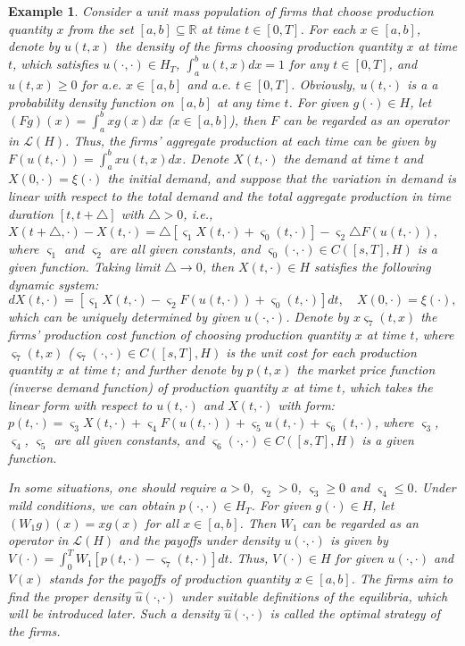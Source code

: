 \documentclass[10pt]{article}
\newtheorem{example}{Example}[section]
\begin{document}
\begin{example}\label{75}
 Consider  a unit mass population of firms that choose production quantity  $x$ from the set $[a,b]\subseteq\mathbb{R}$ at time $t\in[0,T]$. For each $x\in [a,b]$,  denote by $u(t,x)$  the  density of the firms choosing production quantity $x$ at   time $t$, which satisfies $u(\cdot,\cdot)\in H_T$, $\int_a^bu(t,x)dx=1$ for any $t\in[0,T]$, and $u(t,x)\geq0$ for a.e.  $x\in [a,b]$ and  a.e. $t\in[0,T]$. Obviously, $u(t,\cdot)$ is a a probability density function on $[a,b]$ at any time $t$.  For given $g(\cdot)\in H$, let $(Fg)(x)=\int_a^bxg(x)dx$ ($x\in[a,b]$), then $F$ can be regarded as an operator in $\mathcal{L}(H)$. Thus, the firms' aggregate production at each time can be given by $F(u(t,\cdot))=\int_a^bxu(t,x)dx$.  Denote $X(t,\cdot)$  the demand at time $t$  and $X(0,\cdot)=\xi(\cdot)$ the initial demand, and suppose that the variation in demand is linear with respect to the total  demand  and the total aggregate production in time duration $[t,t+\triangle]$ with $\triangle>0$, i.e.,
$X(t+\triangle,\cdot)-X(t,\cdot)=\triangle[\varsigma_1X(t,\cdot)+\varsigma_0(t,\cdot)] -\varsigma_2\triangle F(u(t,\cdot)),$
where $\varsigma_1$ and $\varsigma_2$  are all given constants, and   $\varsigma_0(\cdot,\cdot)\in C([s,T],H)$ is a  given function.  Taking limit $\triangle \rightarrow0$, then   $X(t,\cdot)\in H$ satisfies  the following  dynamic system:
\begin{equation}\label{54}
dX(t,\cdot)=[\varsigma_1X(t,\cdot)-\varsigma_2F(u(t,\cdot))+\varsigma_0(t,\cdot)]dt,\quad 
X(0,\cdot)=\xi(\cdot),
\end{equation}
which can be  uniquely determined by given $u(\cdot,\cdot)$. Denote by  $x\varsigma_7(t,x)$  the  firms' production cost function of choosing production quantity $x$ at time $t$, where $\varsigma_7(t,x)$ ($\varsigma_7(\cdot,\cdot)\in C([s,T],H)$ is the unit cost for each production quantity $x$ at time $t$; and further denote by $p(t,x)$  the market price function (inverse demand function) of production quantity $x$ at time $t$, which takes the linear form with respect to $u(t,\cdot)$ and $X(t,\cdot)$ with form: $p(t,\cdot)=\varsigma_3X(t,\cdot)+\varsigma_4F(u(t,\cdot))+\varsigma_5u(t,\cdot)+\varsigma_6(t,\cdot)$,
where $\varsigma_3$, $\varsigma_4$, $\varsigma_5$  are all given constants, and $\varsigma_6(\cdot,\cdot)\in C([s,T],H)$ is a given function.  

In some situations, one should require $a>0$, $\varsigma_2>0$, $\varsigma_3\geq0$ and $\varsigma_4\leq0$. Under mild conditions, we can obtain $p(\cdot,\cdot)\in H_T$.  For given $g(\cdot)\in H$, let   $(W_1g)(x)=xg(x)$ for all $x\in[a,b]$. Then $W_1$ can be regarded as an operator in $\mathcal{L}(H)$ and the payoffs under density $u(\cdot,\cdot)$ is given by
$V(\cdot)=\int_0^T W_1[p(t,\cdot)-\varsigma_7(t,\cdot)]dt.$
Thus, $V(\cdot)\in H$  for given $u(\cdot,\cdot)$ and $V(x)$ stands for the payoffs of production quantity $x\in [a,b]$. The firms aim to find the proper density $\widehat{u}(\cdot,\cdot)$ under suitable definitions of the equilibria, which will be introduced later. Such a density $\widehat{u}(\cdot,\cdot)$ is called the optimal strategy of the firms.
\end{example}
\end{document}
